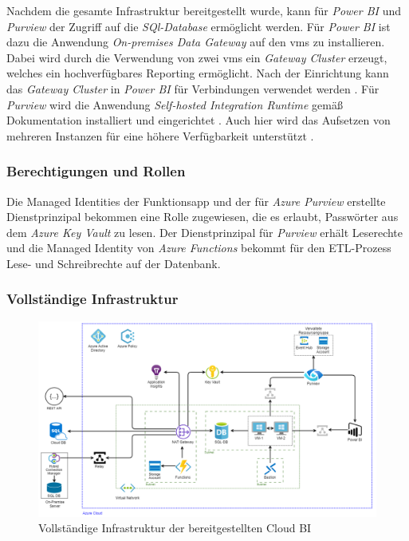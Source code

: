 Nachdem die gesamte Infrastruktur bereitgestellt wurde, kann für \textit{Power BI} und \textit{Purview} der Zugriff auf die \textit{SQl-Database} ermöglicht werden. Für \textit{Power BI} ist dazu die Anwendung \textit{On-premises Data Gateway} auf den \acp{vm} zu installieren. Dabei wird durch die Verwendung von zwei \acp{vm} ein \textit{Gateway Cluster} erzeugt, welches ein hochverfügbares Reporting ermöglicht. Nach der Einrichtung kann das \textit{Gateway Cluster} in \textit{Power BI} für Verbindungen verwendet werden \cite[vgl.][]{gunnarsson_pro_2020}. Für \textit{Purview} wird die Anwendung \textit{Self-hosted Integration Runtime} gemäß Dokumentation installiert und eingerichtet \cite[vgl.][]{msdoc_22_purviewSHIR}. Auch hier wird das Aufsetzen von mehreren Instanzen für eine höhere Verfügbarkeit unterstützt \cite{msdoc_22_purviewSHIRHighAv}. 


\subsubsection{Berechtigungen und Rollen} \label{subsec:infra:konfig:aad}
Die Managed Identities der Funktionsapp und der für \textit{Azure Purview} erstellte Dienstprinzipal bekommen eine Rolle zugewiesen, die es erlaubt, Passwörter aus dem \textit{Azure Key Vault} zu lesen. Der Dienstprinzipal für \textit{Purview} erhält Leserechte und
die Managed Identity von \textit{Azure Functions} bekommt für den ETL-Prozess Lese- und Schreibrechte auf der Datenbank.

\subsubsection{Vollständige Infrastruktur} \label{subsec:infra:konfig:VollständigeInfrastruktur}

 \begin{figure}[htbp]
 \centering
 \includegraphics[width=\textwidth]{gfx/cloudbiinfra.png}
 \caption[Vollständige Infrastruktur der Cloud BI]{Vollständige Infrastruktur der bereitgestellten Cloud BI}
\label{fig:chap04_VollständigeInfrastruktur}
\end{figure}